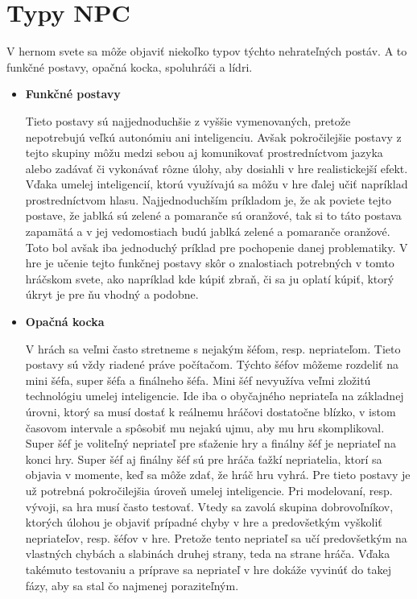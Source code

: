 \documentclass[10pt,twoside,slovak,a4paper]{article}
\begin{document}
\section{Typy NPC} 
\quad V hernom svete sa môže objaviť niekoľko typov týchto nehrateľných postáv. A to funkčné postavy, opačná kocka, spoluhráči a lídri. 
\begin{itemize}
\item \textbf{Funkčné postavy}

\quad Tieto postavy sú najjednoduchšie z vyššie vymenovaných, pretože nepotrebujú veľkú autonómiu ani inteligenciu. Avšak pokročilejšie postavy z tejto skupiny môžu medzi sebou aj komunikovať prostredníctvom jazyka alebo zadávať či vykonávať rôzne úlohy, aby dosiahli v hre realistickejší efekt. Vďaka umelej inteligencií, ktorú využívajú sa môžu v hre ďalej učiť napríklad prostredníctvom hlasu. Najjednoduchším príkladom je, že ak poviete tejto postave, že jablká sú zelené a pomaranče sú oranžové, tak si to táto postava zapamätá a v jej vedomostiach budú jablká zelené a pomaranče oranžové. Toto bol avšak iba jednoduchý príklad pre pochopenie danej problematiky. V hre je učenie tejto funkčnej postavy skôr o znalostiach potrebných v tomto hráčskom svete, ako napríklad kde kúpiť zbraň, či sa ju oplatí kúpiť, ktorý úkryt je pre ňu vhodný a podobne.  \cite{Types}


\item \textbf{Opačná kocka}

\quad V hrách sa veľmi často stretneme s nejakým šéfom, resp. nepriateľom. Tieto postavy sú vždy riadené práve počítačom. Týchto šéfov môžeme rozdeliť na mini šéfa, super šéfa a finálneho šéfa. Mini šéf nevyužíva veľmi zložitú technológiu umelej inteligencie. Ide iba o obyčajného nepriateľa na základnej úrovni, ktorý sa musí dostať k reálnemu hráčovi dostatočne blízko, v istom časovom intervale a spôsobiť mu nejakú ujmu, aby mu hru skomplikoval. Super šéf je voliteľný nepriateľ pre sťaženie hry a finálny šéf je nepriateľ na konci hry. Super šéf aj finálny šéf sú pre hráča ťažkí nepriatelia, ktorí sa objavia v momente, keď sa môže zdať, že hráč hru vyhrá. Pre tieto postavy je už potrebná pokročilejšia úroveň umelej inteligencie. Pri modelovaní, resp. vývoji, sa hra musí často testovať. Vtedy sa zavolá skupina dobrovoľníkov, ktorých úlohou je objaviť prípadné chyby v hre a predovšetkým vyškoliť nepriateľov, resp. šéfov v hre. Pretože tento nepriateľ sa učí predovšetkým na vlastných chybách a slabinách druhej strany, teda na strane hráča. Vďaka takémuto testovaniu a príprave sa nepriateľ v hre dokáže vyvinúť do takej fázy, aby sa stal čo najmenej poraziteľným.  \cite{Types}


\end{itemize}
\end{document}
